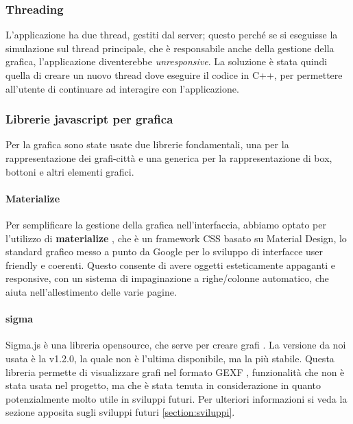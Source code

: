 \documentclass[main.tex]{subfiles}
\begin{document}
\subsubsection{Threading}
L'applicazione ha due thread, gestiti dal server; questo perché se si eseguisse la simulazione sul thread principale, che è responsabile anche della gestione della grafica, l'applicazione diventerebbe \textit{unresponsive}. La soluzione è stata quindi quella di creare un nuovo thread dove eseguire il codice in C++, per permettere all'utente di continuare ad interagire con l'applicazione. 

\subsubsection{Librerie javascript per grafica}
Per la grafica sono state usate due librerie fondamentali, una per la rappresentazione dei grafi-città e una generica per la rappresentazione di box, bottoni e altri elementi grafici. 

\paragraph{Materialize}

Per semplificare la gestione della grafica nell'interfaccia, abbiamo optato per l'utilizzo di \textbf{materialize} \cite{materialize}, che è un framework CSS basato su Material Design, lo standard grafico messo a punto da Google per lo sviluppo di interfacce user friendly e coerenti. Questo consente di avere oggetti esteticamente appaganti e responsive, con un sistema di impaginazione a righe/colonne automatico, che aiuta nell'allestimento delle varie pagine.

\paragraph{sigma} 

Sigma.js è una libreria opensource, che serve per creare grafi \cite{sigmajs}. La versione da noi usata è la v1.2.0, la quale non è l'ultima disponibile, ma la più stabile. Questa libreria permette di visualizzare grafi nel formato GEXF \cite{gexf}, funzionalità che non è stata usata nel progetto, ma che è stata tenuta in considerazione in quanto potenzialmente molto utile in sviluppi futuri. Per ulteriori informazioni si veda la sezione apposita sugli sviluppi futuri  
\ref{section:sviluppi}.
\end{document}

